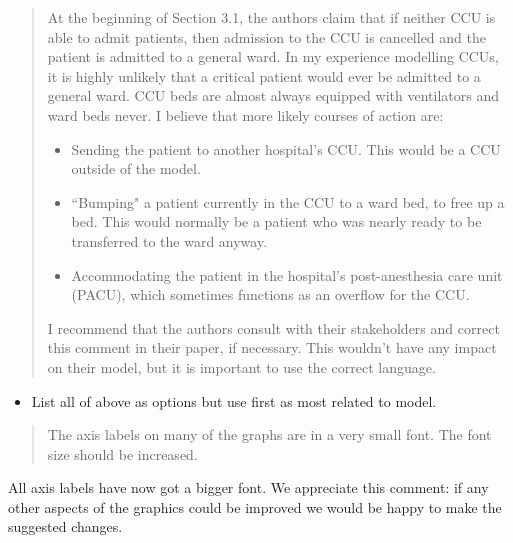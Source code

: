 \documentclass{article}
\begin{document}
\begin{quote}
    \begin{textit}
        {
        At the beginning of Section 3.1, the authors claim that if neither CCU
        is able to admit patients, then admission to the CCU is cancelled and
        the patient is admitted to a general ward. In my experience modelling
        CCUs, it is highly unlikely that a critical patient would ever be
        admitted to a general ward.  CCU beds are almost always equipped with
        ventilators and ward beds never. I believe that more likely courses of
        action are:
        \begin{itemize}
         \item Sending the patient to another hospital's CCU.  This would be a CCU
           outside of the model.
         \item ``Bumping" a patient currently in the CCU to a ward bed, to free up
           a bed. This would normally be a patient who was nearly ready to be
           transferred to the ward anyway.
         \item Accommodating the patient in the hospital's post-anesthesia care
           unit (PACU), which sometimes functions as an overflow for the CCU.
        \end{itemize}
        I recommend that the authors consult with their stakeholders and
        correct this comment in their paper, if necessary.  This wouldn't have
        any impact on their model, but it is important to use the correct
        language.
        }
    \end{textit}
\end{quote}

\begin{itemize}
    \item List all of above as options but use first as most related to model.
\end{itemize}

\begin{quote}
    \begin{textit}
        {
        The axis labels on many of the graphs are in a very small font. The
        font size should be increased.
        }
    \end{textit}
\end{quote}

All axis labels have now got a bigger font. We appreciate this comment: if any
other aspects of the graphics could be improved we would be happy to make the
suggested changes.
\end{document}

